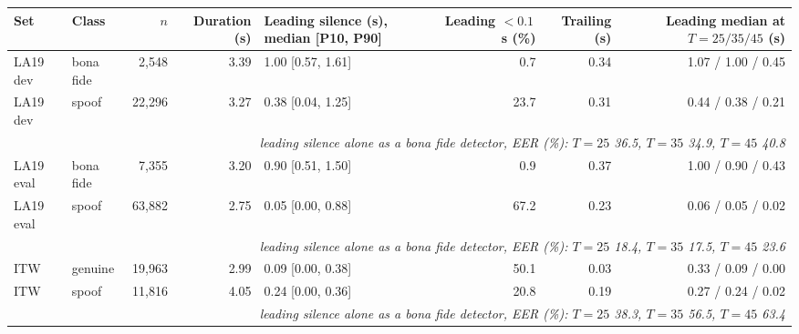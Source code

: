 \begin{tabular}{@{}llrrlrrr@{}}
\toprule
Set & Class & $n$ & Duration (s) & Leading silence (s), median [P10, P90] & Leading $<0.1$\,s (\%) & Trailing (s) & Leading median at $T=25/35/45$ (s) \\
\midrule
LA19 dev & bona fide & 2,548 & 3.39 & 1.00 [0.57, 1.61] & 0.7 & 0.34 & 1.07 / 1.00 / 0.45 \\
LA19 dev & spoof & 22,296 & 3.27 & 0.38 [0.04, 1.25] & 23.7 & 0.31 & 0.44 / 0.38 / 0.21 \\
\multicolumn{8}{r}{\emph{leading silence alone as a bona fide detector, EER (\%): $T=25$ 36.5, $T=35$ 34.9, $T=45$ 40.8}} \\
\midrule
LA19 eval & bona fide & 7,355 & 3.20 & 0.90 [0.51, 1.50] & 0.9 & 0.37 & 1.00 / 0.90 / 0.43 \\
LA19 eval & spoof & 63,882 & 2.75 & 0.05 [0.00, 0.88] & 67.2 & 0.23 & 0.06 / 0.05 / 0.02 \\
\multicolumn{8}{r}{\emph{leading silence alone as a bona fide detector, EER (\%): $T=25$ 18.4, $T=35$ 17.5, $T=45$ 23.6}} \\
\midrule
ITW & genuine & 19,963 & 2.99 & 0.09 [0.00, 0.38] & 50.1 & 0.03 & 0.33 / 0.09 / 0.00 \\
ITW & spoof & 11,816 & 4.05 & 0.24 [0.00, 0.36] & 20.8 & 0.19 & 0.27 / 0.24 / 0.02 \\
\multicolumn{8}{r}{\emph{leading silence alone as a bona fide detector, EER (\%): $T=25$ 38.3, $T=35$ 56.5, $T=45$ 63.4}} \\
\bottomrule
\end{tabular}
